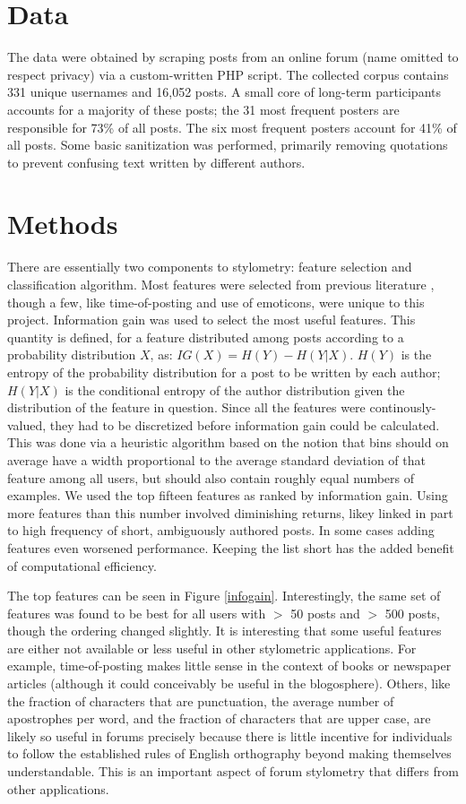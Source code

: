\documentclass[12pt,letterpaper,onecolumn,oneside]{article}
\numberwithin{equation}{section}
\numberwithin{figure}{section}
\begin{document}
\section{Data}
The data were obtained by scraping posts from an online forum (name omitted to respect privacy) via a custom-written PHP script. The collected corpus contains 331 unique usernames and 16,052 posts. A small core of 
long-term participants accounts for a majority of these posts; the 31 most frequent posters are responsible for 73\% of all posts. The six most frequent posters account for 41\% of all posts. Some basic 
sanitization was performed, primarily removing quotations to prevent confusing text written by different authors.

\section{Methods}
There are essentially two components to stylometry: feature selection and classification algorithm. Most features were selected from previous literature \cite{anonymouth,stanford}, though a few, like 
time-of-posting and use of emoticons, were unique to this project. Information gain was used to select the most useful features. This quantity is defined, for a feature distributed among posts according to a 
probability distribution \(X\), as: \(IG(X) = H(Y) - H(Y|X)\). \(H(Y)\) is the entropy of the probability distribution for a post to be written by each author; \(H(Y|X)\) is the conditional entropy of the author 
distribution given the distribution of the feature in question. Since all the features were continously-valued, they had to be discretized before information gain could be calculated. This was done via a heuristic 
algorithm based on the notion that bins should on average have a width proportional to the average standard deviation of that feature among all users, but should also contain roughly equal numbers of examples. We 
used the top fifteen features as ranked by information gain. Using more features than this number involved diminishing returns, likey linked in part to high frequency of short, ambiguously authored posts. In some 
cases adding features even worsened performance. Keeping the list short has the added benefit of computational efficiency.

The top features can be seen in Figure \ref{infogain}. Interestingly, the same set of features was found to be best for all users with \(>\) 50 posts and \(>\) 500 posts, though the ordering changed slightly. It is 
interesting that some useful features are either not available or less useful in other stylometric applications. For example, time-of-posting makes little sense in the context of books or newspaper articles 
(although it could conceivably be useful in the blogosphere). Others, like the fraction of characters that are punctuation, the average number of apostrophes per word, and the fraction of characters that are upper case, 
are likely so useful in forums precisely because there is little incentive for individuals to follow the established rules of English orthography beyond making themselves understandable. This is an important aspect of 
forum stylometry that differs from other applications.
\end{document}
